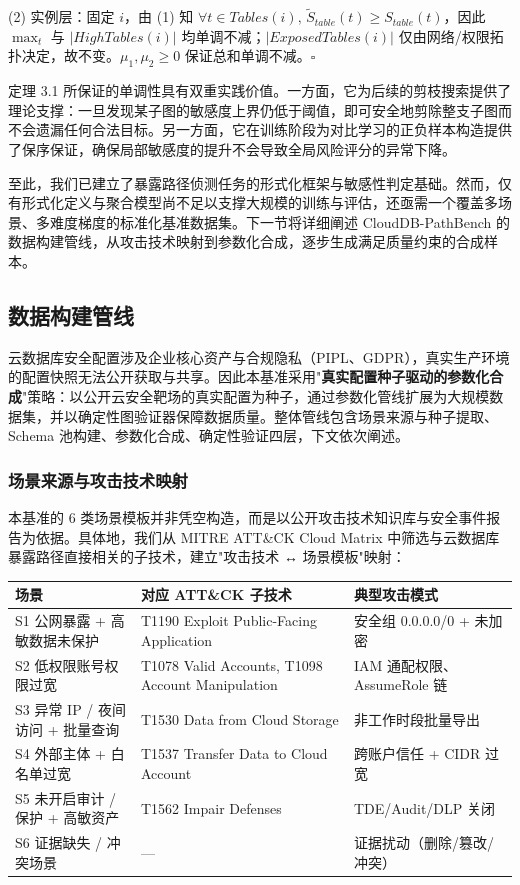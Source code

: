 \documentclass[a4paper,12pt]{ctexart}
\begin{document}
(2) 实例层：固定 $i$，由 (1) 知 $\forall t \in Tables(i),\,\widetilde{S}_{table}(t) \ge S_{table}(t)$，因此 $\max_t$ 与 $|HighTables(i)|$ 均单调不减；$|ExposedTables(i)|$ 仅由网络/权限拓扑决定，故不变。$\mu_1, \mu_2 \ge 0$ 保证总和单调不减。$\square$

定理 3.1 所保证的单调性具有双重实践价值。一方面，它为后续的剪枝搜索提供了理论支撑：一旦发现某子图的敏感度上界仍低于阈值，即可安全地剪除整支子图而不会遗漏任何合法目标。另一方面，它在训练阶段为对比学习的正负样本构造提供了保序保证，确保局部敏感度的提升不会导致全局风险评分的异常下降。

至此，我们已建立了暴露路径侦测任务的形式化框架与敏感性判定基础。然而，仅有形式化定义与聚合模型尚不足以支撑大规模的训练与评估，还亟需一个覆盖多场景、多难度梯度的标准化基准数据集。下一节将详细阐述 CloudDB-PathBench 的数据构建管线，从攻击技术映射到参数化合成，逐步生成满足质量约束的合成样本。

\subsection{数据构建管线}

云数据库安全配置涉及企业核心资产与合规隐私（PIPL、GDPR），真实生产环境的配置快照无法公开获取与共享。因此本基准采用"\textbf{真实配置种子驱动的参数化合成}"策略：以公开云安全靶场的真实配置为种子，通过参数化管线扩展为大规模数据集，并以确定性图验证器保障数据质量。整体管线包含场景来源与种子提取、Schema 池构建、参数化合成、确定性验证四层，下文依次阐述。

\subsubsection{场景来源与攻击技术映射}

本基准的 6 类场景模板并非凭空构造，而是以公开攻击技术知识库与安全事件报告为依据。具体地，我们从 MITRE ATT\&CK Cloud Matrix 中筛选与云数据库暴露路径直接相关的子技术，建立"攻击技术 ↔ 场景模板"映射：

\begin{table}[htbp]
\centering
\small
\setlength{\tabcolsep}{4pt}
\begin{tabular}{|l|l|l|}
\hline
\textbf{场景} & \textbf{对应 ATT\&CK 子技术} & \textbf{典型攻击模式} \\
\hline
S1 公网暴露 + 高敏数据未保护 & T1190 Exploit Public-Facing Application & 安全组 0.0.0.0/0 + 未加密 \\
\hline
S2 低权限账号权限过宽 & T1078 Valid Accounts, T1098 Account Manipulation & IAM 通配权限、AssumeRole 链 \\
\hline
S3 异常 IP / 夜间访问 + 批量查询 & T1530 Data from Cloud Storage & 非工作时段批量导出 \\
\hline
S4 外部主体 + 白名单过宽 & T1537 Transfer Data to Cloud Account & 跨账户信任 + CIDR 过宽 \\
\hline
S5 未开启审计 / 保护 + 高敏资产 & T1562 Impair Defenses & TDE/Audit/DLP 关闭 \\
\hline
S6 证据缺失 / 冲突场景 & — & 证据扰动（删除/篡改/冲突） \\
\hline
\end{tabular}
\end{table}
\end{document}
